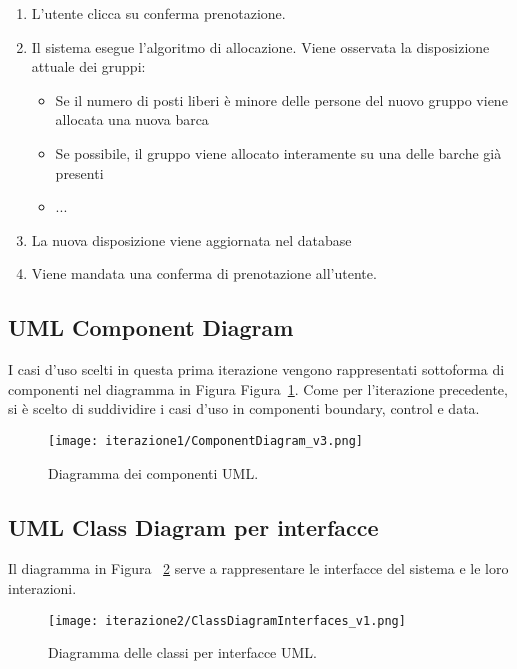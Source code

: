 \begin{enumerate}
    \item L'utente clicca su conferma prenotazione.
    \item Il sistema esegue l'algoritmo di allocazione. Viene osservata la disposizione attuale dei gruppi:
    \begin{itemize}
        \item Se il numero di posti liberi è minore delle persone del nuovo gruppo viene allocata una nuova barca
        \item Se possibile, il gruppo viene allocato interamente su una delle barche già presenti
        \item ...
    \end{itemize}
    \item La nuova disposizione viene aggiornata nel database
    \item Viene mandata una conferma di prenotazione all'utente.
\end{enumerate}

\subsection{UML Component Diagram}
I casi d’uso scelti in questa prima iterazione vengono rappresentati sottoforma di componenti nel diagramma in Figura Figura~\ref{fig:componentDiagram2}. Come per l'iterazione precedente, si è scelto di suddividire i casi d’uso in componenti boundary, control e data.

\begin{figure}[htbp]
    \texttt{[image: iterazione1/ComponentDiagram\_v3.png]}
    \centering
    \caption{Diagramma dei componenti UML.}\label{fig:componentDiagram2}
\end{figure}

\subsection{UML Class Diagram per interfacce}
Il diagramma in Figura ~\ref{fig:ClassDiagramInterfaces2} serve a rappresentare le interfacce del sistema e le
loro interazioni.

\begin{figure}[htbp]
    \texttt{[image: iterazione2/ClassDiagramInterfaces\_v1.png]}
    \centering
    \caption{Diagramma delle classi per interfacce UML.}\label{fig:ClassDiagramInterfaces2}
\end{figure}

